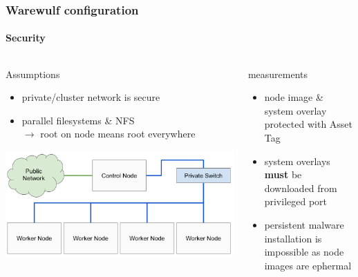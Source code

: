 \documentclass[aspectratio=169]{beamer}
\begin{document}
\begin{frame}[fragile]
\frametitle{Warewulf configuration}
\framesubtitle{Security}
\begin{columns}
\begin{block}{Assumptions}
  \begin{itemize}
    \item private/cluster network is secure
    \item parallel filesystems \& NFS \\
    $\rightarrow$ root on node means root everywhere
  \end{itemize}
  \includegraphics[width=\linewidth]{beowulf_architecture}
\end{block}
\begin{block}{measurements}
  \begin{itemize}
    \item node image \& system overlay protected with Asset Tag 
    \item system overlays \textbf{must} be downloaded from privileged port
    \item persistent malware installation is impossible as node images are ephermal
  \end{itemize}
\end{block}
\column{2cm}
\end{columns}
\end{frame}
\end{document}
